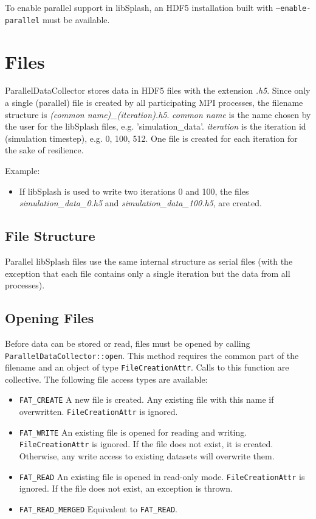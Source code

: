\documentclass[a4paper,10pt,BCOR12mm]{report}
\newcommand{\code}[1]{\small \texttt{#1}}
\begin{document}
To enable parallel support in libSplash, an HDF5 installation built with \code{--enable-parallel}
must be available.


\section{Files}

ParallelDataCollector stores data in HDF5 files with the extension \emph{.h5}.
Since only a single (parallel) file is created by all participating MPI processes,
the filename structure is \emph{(common name)\_(iteration).h5}.
\emph{common name} is the name chosen by the user for the libSplash files, e.g.
'simulation\_data'.
\emph{iteration} is the iteration id (simulation timestep), e.g. 0, 100, 512.
One file is created for each iteration for the sake of resilience.

Example:
\begin{itemize}
	\item If libSplash is used to write two iterations 0 and 100, the files
	\emph{simulation\_data\_0.h5} and \emph{simulation\_data\_100.h5}, are created.
\end{itemize}


\subsection{File Structure}

Parallel libSplash files use the same internal structure as serial files (with the exception
that each file contains only a single iteration but the data from all processes).


\subsection{Opening Files}

Before data can be stored or read, files must be opened by calling
\code{ParallelDataCollector::open}. This method requires the common part of the filename
and an object of type \code{FileCreationAttr}.
Calls to this function are collective.
The following file access types are available:
\begin{itemize}
	\item \code{FAT\_CREATE}
	A new file is created. Any existing file with this name if overwritten.
	\code{FileCreationAttr} is ignored.

	\item \code{FAT\_WRITE}
	An existing file is opened for reading and writing.
	\code{FileCreationAttr} is ignored.
	If the file does not exist, it is created.
	Otherwise, any write access to existing datasets will overwrite them.

	\item \code{FAT\_READ}
	An existing file is opened in read-only mode.
	\code{FileCreationAttr} is ignored.
	If the file does not exist, an exception is thrown.

	\item \code{FAT\_READ\_MERGED}
	Equivalent to \code{FAT\_READ}.
\end{itemize}
\end{document}
